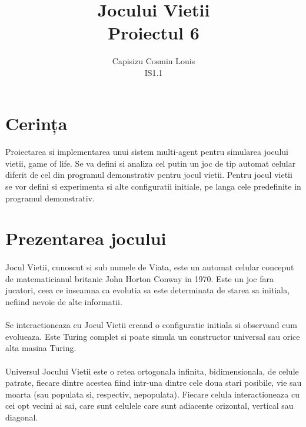 \documentclass[11pt ,A4]{article}
\title{Jocului Vietii\\Proiectul 6}
\author{Capisizu Cosmin Louis\\IS1.1} %
\begin{document}
    \maketitle %
    \pagebreak

    \section{Cerința} %
        \paragraph{}
            Proiectarea si implementarea unui sistem multi-agent pentru simularea jocului vietii, game of life. Se va defini si analiza cel putin un joc de tip automat celular diferit de cel din programul demonstrativ pentru jocul vietii. Pentru jocul vietii se vor defini si experimenta si alte configuratii initiale, pe langa cele predefinite in programul demonstrativ.

    \section{Prezentarea jocului}

        \paragraph{}Jocul Vietii, cunoscut si sub numele de Viata, este un automat celular conceput de matematicianul britanic John Horton Conway in 1970. Este un joc fara jucatori, ceea ce inseamna ca evolutia sa este determinata de starea sa initiala, nefiind nevoie de alte informatii.

        \paragraph{} Se interactioneaza cu Jocul Vietii creand o configuratie initiala si observand cum evolueaza. Este Turing complet si poate simula un constructor universal sau orice alta masina Turing.

        \paragraph{} Universul Jocului Vietii este o retea ortogonala infinita, bidimensionala, de celule patrate, fiecare dintre acestea fiind intr-una dintre cele doua stari posibile, vie sau moarta (sau populata si, respectiv, nepopulata). Fiecare celula interactioneaza cu cei opt vecini ai sai, care sunt celulele care sunt adiacente orizontal, vertical sau diagonal.
\end{document}
